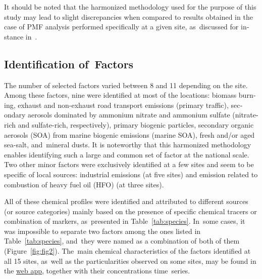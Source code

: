 \begin{otherlanguage}{english}
It should be noted that the harmonized methodology used for the purpose of this study may
lead to slight discrepancies when compared to results obtained in the case of PMF analysis
performed specifically at a given site, as~discussed for instance
in~\textcite{favezTraitement2017}.

\subsection{Identification  of~Factors}%
\label{sub:identification_of_factors}

The number of selected factors varied between 8 and 11 depending on the site.  Among these
factors, nine  were identified at most of the locations: biomass burning, exhaust and
non-exhaust road transport emissions (primary traffic), secondary aerosols dominated by
ammonium nitrate and ammonium sulfate (nitrate-rich and sulfate-rich, respectively),
primary biogenic particles, secondary organic aerosols (SOA) from marine biogenic
emissions (marine SOA), fresh and/or aged sea-salt, and~mineral dusts. It is noteworthy
that this harmonized methodology enables   identifying such a large and common set of
factor at the national scale. Two other minor factors   were exclusively identified at a
few sites and seem to be specific of local sources: industrial emissions (at five sites)
and emission related to combustion of heavy fuel oil (HFO) (at three sites). 

All of these chemical profiles  were identified and attributed to different sources (or
source categories) mainly based on the presence of specific chemical tracers or
combination of markers, as~presented in Table~\ref{tab:species}. In~some cases, it was
impossible to separate two factors among   the ones listed in Table~\ref{tab:species},
and~they were named as a combination of both of them (Figure~\ref{fig:fig2}). The~main
chemical characteristics of the factors identified at all 15 sites, as~well as the
particularities observed on some sites, may be found in the
\href{http://pmsources.u-ga.fr}{web app}, together with their concentrations time~series.


\end{otherlanguage}
